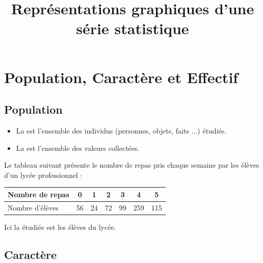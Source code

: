 \documentclass[12pt,a4paper]{article}
\date{}
\title{Représentations graphiques d'une série statistique }
\begin{document}


\section{Population, Caractère et Effectif}

\subsection{Population}
\begin{mydefs}
	\begin{itemize}
		\item La  est l'ensemble des individus (personnes, objets, faits ...) étudiés.
		\item La  est l'ensemble des valeurs collectées.
	\end{itemize}
\end{mydefs}


\begin{myex}
	
	Le tableau suivant présente le nombre de repas pris chaque semaine par les élèves d'un lycée professionnel :
	
	\begin{center}
		\begin{tabular}{|@{\ }l@{\ }|@{\ }c@{\ }|@{\ }c@{\ }|@{\ }c@{\ }|@{\ }c@{\ }|@{\ }c@{\ }|@{\ }c@{\ }|}
			\hline
			Nombre de repas & 0 & 1 & 2 & 3 & 4 & 5 \\ \hline
			Nombre d'élèves & 56 & 24 & 72 & 99 & 259 & 115 \\ \hline
		\end{tabular}
	\end{center}
	
	Ici la  étudiée est les élèves du lycée.
\end{myex}


\subsection{Caractère}
\end{document}
